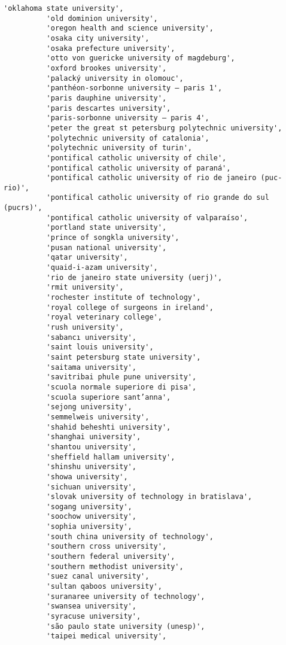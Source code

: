 \documentclass[11pt]{article}
\begin{document}
\begin{Verbatim}[commandchars=\\\{\}]
          'oklahoma state university',
          'old dominion university',
          'oregon health and science university',
          'osaka city university',
          'osaka prefecture university',
          'otto von guericke university of magdeburg',
          'oxford brookes university',
          'palacký university in olomouc',
          'panthéon-sorbonne university – paris 1',
          'paris dauphine university',
          'paris descartes university',
          'paris-sorbonne university – paris 4',
          'peter the great st petersburg polytechnic university',
          'polytechnic university of catalonia',
          'polytechnic university of turin',
          'pontifical catholic university of chile',
          'pontifical catholic university of paraná',
          'pontifical catholic university of rio de janeiro (puc-rio)',
          'pontifical catholic university of rio grande do sul (pucrs)',
          'pontifical catholic university of valparaíso',
          'portland state university',
          'prince of songkla university',
          'pusan national university',
          'qatar university',
          'quaid-i-azam university',
          'rio de janeiro state university (uerj)',
          'rmit university',
          'rochester institute of technology',
          'royal college of surgeons in ireland',
          'royal veterinary college',
          'rush university',
          'sabancı university',
          'saint louis university',
          'saint petersburg state university',
          'saitama university',
          'savitribai phule pune university',
          'scuola normale superiore di pisa',
          'scuola superiore sant’anna',
          'sejong university',
          'semmelweis university',
          'shahid beheshti university',
          'shanghai university',
          'shantou university',
          'sheffield hallam university',
          'shinshu university',
          'showa university',
          'sichuan university',
          'slovak university of technology in bratislava',
          'sogang university',
          'soochow university',
          'sophia university',
          'south china university of technology',
          'southern cross university',
          'southern federal university',
          'southern methodist university',
          'suez canal university',
          'sultan qaboos university',
          'suranaree university of technology',
          'swansea university',
          'syracuse university',
          'são paulo state university (unesp)',
          'taipei medical university',

\end{Verbatim}
\end{document}
